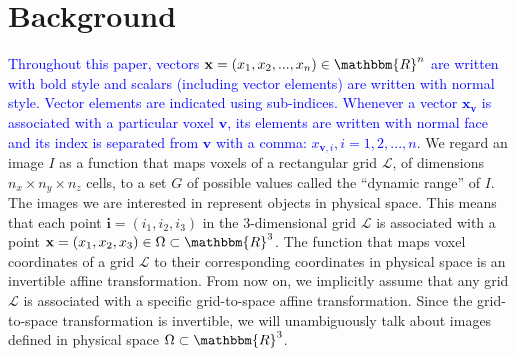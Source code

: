 \section{Background}
\textcolor{blue}{Throughout this paper, vectors $\mathbf{x}=(x_{1}, x_{2}, ..., x_{n}) \in \mathbbm{R}^{n}$ are written with bold style and scalars (including vector elements) are written with normal style. Vector elements are indicated using sub-indices. Whenever a vector $\mathbf{x_{v}}$ is associated with a particular voxel $\mathbf{v}$, its elements are written with normal face and its index is separated from $\mathbf{v}$ with a comma: $x_{\mathbf{v}, i}, i=1, 2, ..., n$}. We regard an image $I$ as a function that maps voxels of a rectangular grid \hbox{$\mathcal{L}$}, of dimensions $n_{x} \times n_{y} \times n_{z}$ cells, to a set $G$ of
possible values called the ``dynamic range'' of $I$. The images we are interested in represent objects in physical space. This means that each point $\mathbf{i}=(i_{1},i_{2},i_{3})$ in the
3-dimensional grid $\mathcal{L}$ is associated with a point $\mathbf{x}=(x_{1},x_{2},x_{3}) \in \Omega \subset \mathbbm{R}^{3}$. The function that maps voxel coordinates of a grid $\mathcal{L}$ to their corresponding coordinates in physical space is an invertible affine transformation. From now on, we implicitly assume that any grid $\mathcal{L}$ is associated with a specific grid-to-space affine transformation. Since the grid-to-space transformation is invertible, we will unambiguously talk about images defined in physical space $\Omega \subset \mathbbm{R}^{3}$.\\

\vspace{-0.5cm}
